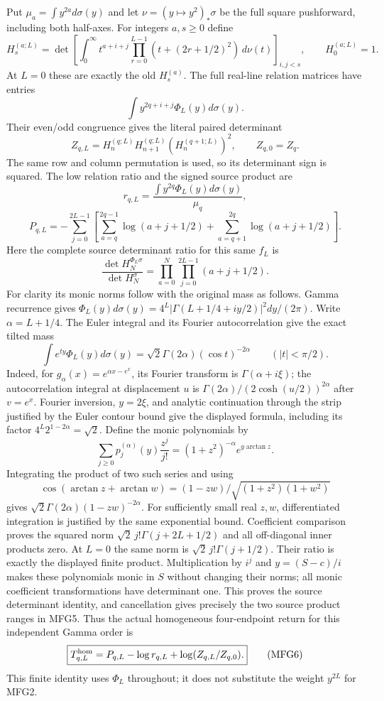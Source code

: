 \documentclass[11pt,a4paper]{article}
\begin{document}
Put $\mu_a=\int y^{2a}d\sigma(y)$ and let $\nu=(y\mapsto y^2)_*\sigma$
be the full square pushforward, including both half-axes. For integers
$a,s\ge0$ define
\[
 H_s^{(a;L)}=\det\left[
    \int_0^\infty t^{a+i+j}
             \prod_{r=0}^{L-1}(t+(2r+1/2)^2)\,d\nu(t)
                  \right]_{i,j<s},\qquad H_0^{(a;L)}=1.
 \tag{MFG3}
\]
At $L=0$ these are exactly the old $H_s^{(a)}$. The full real-line
relation matrices have entries
\[\int y^{2q+i+j}\Phi_L(y)d\sigma(y).\] Their even/odd congruence gives
the literal paired determinant
\[
 Z_{q,L}=H_n^{(q;L)}H_{n+1}^{(q;L)}(H_n^{(q+1;L)})^2,
 \qquad Z_{q,0}=Z_q.
 \tag{MFG4}
\]
The same row and column permutation is used, so its determinant sign
is squared. The low relation ratio and the signed source product are
\[
 r_{q,L}=\frac{\int y^{2q}\Phi_L(y)d\sigma(y)}{\mu_q},
\]
\[
 P_{q,L}=-\sum_{j=0}^{2L-1}
 \left[\sum_{a=q}^{2q-1}\log(a+j+1/2)
       +\sum_{a=q+1}^{2q}\log(a+j+1/2)\right].
 \tag{MFG5}
\]
Here the complete source determinant ratio for this same $f_L$ is
\[
 \frac{\det H_N^{\Phi_L\sigma}}{\det H_N^\sigma}
 =\prod_{a=0}^N\prod_{j=0}^{2L-1}(a+j+1/2).
\]
For clarity its monic norms follow with the original mass as follows.
Gamma recurrence gives
$\Phi_L(y)d\sigma(y)=4^L|\Gamma(L+1/4+iy/2)|^2dy/(2\pi)$.
Write $\alpha=L+1/4$. The Euler integral and its Fourier
autocorrelation give the exact tilted mass
\[
 \int e^{ty}\Phi_L(y)d\sigma(y)
       =\sqrt2\Gamma(2\alpha)(\cos t)^{-2\alpha}
       \qquad(|t|<\pi/2).
\]
Indeed, for $g_\alpha(x)=e^{\alpha x-e^x}$, its Fourier transform is
$\Gamma(\alpha+i\xi)$; the autocorrelation integral at displacement
$u$ is $\Gamma(2\alpha)/(2\cosh(u/2))^{2\alpha}$ after $v=e^x$.
Fourier inversion, $y=2\xi$, and analytic continuation through the
strip justified by the Euler contour bound give the displayed formula,
including its factor $4^L2^{1-2\alpha}=\sqrt2$.
Define the monic polynomials by
\[
 \sum_{j\ge0}p_j^{(\alpha)}(y)\frac{z^j}{j!}
       =(1+z^2)^{-\alpha}e^{y\arctan z}.
\]
Integrating the product of two such series and using
\[\cos(\arctan z+\arctan w)=(1-zw)/\sqrt{(1+z^2)(1+w^2)}\]
gives $\sqrt2\Gamma(2\alpha)(1-zw)^{-2\alpha}$.
For sufficiently small real $z,w$, differentiated integration is
justified by the same exponential bound. Coefficient comparison
proves the squared norm $\sqrt2\,j!\Gamma(j+2L+1/2)$ and all
off-diagonal inner products zero. At $L=0$ the same norm is
$\sqrt2\,j!\Gamma(j+1/2)$. Their ratio is exactly the displayed
finite product. Multiplication by $i^j$ and $y=(S-c)/i$ makes these
polynomials monic in $S$ without changing their norms; all monic
coefficient transformations have determinant one. This proves the
source determinant identity, and cancellation gives precisely the
two source product ranges in MFG5. Thus the actual homogeneous
four-endpoint return for this independent Gamma order is
\[
 \boxed{T_{q,L}^{\rm hom}
       =P_{q,L}-\log r_{q,L}+\log(Z_{q,L}/Z_{q,0}).}
 \tag{MFG6}
\]
This finite identity uses $\Phi_L$ throughout; it does not substitute
the weight $y^{2L}$ for MFG2.
\end{document}
